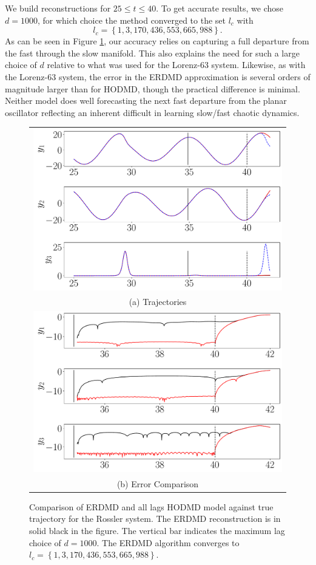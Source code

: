 \documentclass[a4paper,11pt]{article}
\begin{document}
We build reconstructions for $25\leq t \leq 40$.  To get accurate results, we chose $d=1000$, for which choice the method converged to the set $l_{c}$ with
\[
l_{c} = \left\{1, 3, 170, 436, 553, 665, 988\right\}.
\]
As can be seen in Figure \ref{fig:rossler}, our accuracy relies on capturing a full departure from the fast through the slow manifold.  This also explains the need for such a large choice of $d$ relative to what was used for the Lorenz-63 system.  Likewise, as with the Lorenz-63 system, the error in the ERDMD approximation is several orders of magnitude larger than for HODMD, though the practical difference is minimal.  Neither model does well forecasting the next fast departure from the planar oscillator reflecting an inherent difficult in learning slow/fast chaotic dynamics.  
\begin{figure}[!h]
\centering
\begin{tabular}{c}
\includegraphics[width=.8\textwidth]{Rossler_compare_w_mx_lag_1000}\\
(a) Trajectories \\
\includegraphics[width=.8\textwidth]{Rossler_error_compare_w_mx_lag_1000}\\
(b) Error Comparison
\end{tabular}
\caption{Comparison of ERDMD and all lags HODMD model against true trajectory for the Rossler system.  The ERDMD reconstruction is in solid black in the figure.  The vertical bar indicates the maximum lag choice of $d=1000$. The ERDMD algorithm converges to $l_{c}=\left\{1, 3, 170, 436, 553, 665, 988\right\}$.}
\label{fig:rossler}
\end{figure}
\end{document}
